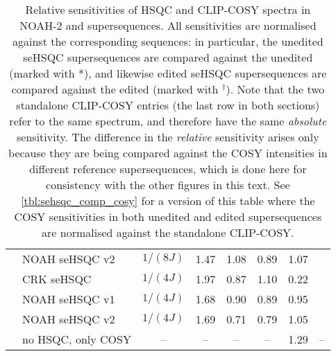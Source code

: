 {\begin{table}
\begin{tabular}{clcccccc}
         & NOAH seHSQC v2      & $1/(8J)$       & 1.47 & 1.08 & 0.89 & 1.07 & {fig:edited_sn_comp_spv2} \\
         & CRK seHSQC          & $1/(4J)$       & 1.97 & 0.87 & 1.10 & 0.22 & {fig:combined_1_4j_ed_crk} \\
         & NOAH seHSQC v1      & $1/(4J)$       & 1.68 & 0.90 & 0.89 & 0.95 & {fig:combined_1_4j_ed_spv1} \\
         & NOAH seHSQC v2      & $1/(4J)$       & 1.69 & 0.71 & 0.79 & 1.05 & {fig:combined_1_4j_ed_spv2} \\
         & no HSQC, only COSY  & --             & --   & --   & --   & 1.29 & -- \\ 
        \bottomrule
    \end{tabular}
    \caption{
        Relative sensitivities of HSQC and CLIP-COSY spectra in NOAH-2  and  supersequences.
        All sensitivities are normalised against the corresponding  sequences: in particular, the unedited seHSQC supersequences are compared against the unedited  (marked with *), and likewise edited seHSQC supersequences are compared against the edited  (marked with $^\dagger$).
        Note that the two standalone CLIP-COSY entries (the last row in both sections) refer to the same spectrum, and therefore have the same \textit{absolute} sensitivity.
        The difference in the \textit{relative} sensitivity arises only because they are being compared against the COSY intensities in different reference supersequences, which is done here for consistency with the other figures in this text.
        See \cref{tbl:sehsqc_comp_cosy} for a version of this table where the COSY sensitivities in both unedited and edited supersequences are normalised against the standalone CLIP-COSY.
        \andro{}
    }
    \label{tbl:sehsqc_comp}
\end{table}
} %

